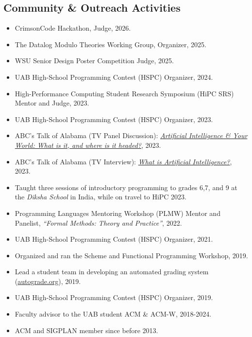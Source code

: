 \documentclass[line]{res}
\begin{document}
\begin{resume}
\section{\large Community \& Outreach Activities} \vspace{0.45cm}
\begin{itemize}
  \item CrimsonCode Hackathon, Judge, 2026.
  \item The Datalog Modulo Theories Working Group, Organizer, 2025.
  \item WSU Senior Design Poster Competition Judge, 2025.
  \item UAB High-School Programming Contest (HSPC) Organizer, 2024.
  \item High-Performance Computing Student Research Symposium (HiPC SRS) Mentor and Judge, 2023.
  \item UAB High-School Programming Contest (HSPC) Organizer, 2023.
  \item ABC's Talk of Alabama (TV Panel Discussion): \href{https://tinyurl.com/abc-talk-of-alabama-gilray}{\emph{Artificial Intelligence \& Your World: What is it, and where is it headed?}}, 2023.
  \item ABC's Talk of Alabama (TV Interview): \href{https://tinyurl.com/abc-talk-of-alabama-gilray}{\emph{What is Artificial Intelligence?}}, 2023.
  \item Taught three sessions of introductory programming to grades 6,7, and 9 at the \emph{Diksha School} in India, while on travel to HiPC 2023.
  \item Programming Languages Mentoring Workshop (PLMW) Mentor and Panelist, \emph{``Formal Methods: Theory and Practice''}, 2022.
  \item UAB High-School Programming Contest (HSPC) Organizer, 2021.
  \item Organized and ran the Scheme and Functional Programming Workshop, 2019.
  \item Lead a student team in developing an automated grading system (\href{https://autograde.org}{autograde.org}), 2019.
  \item UAB High-School Programming Contest (HSPC) Organizer, 2019.  
  \item Faculty advisor to the UAB student ACM \& ACM-W, 2018-2024.
  \item ACM and SIGPLAN member since before 2013.
\end{itemize}


\end{resume}
\end{document}
